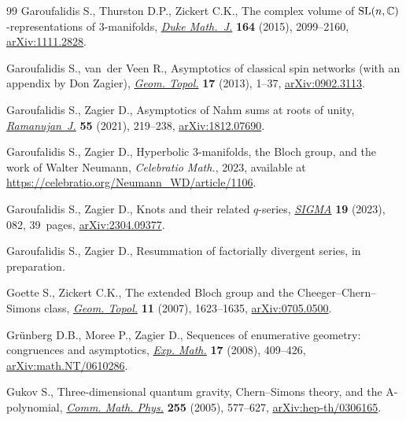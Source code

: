 \documentclass[pdftex]{sigma}
\numberwithin{equation}{section}
\begin{document}
\begin{thebibliography}{99}
Garoufalidis S., Thurston D.P., Zickert C.K., The complex volume of {${\rm
 SL}(n,\mathbb{C})$}-representations of 3-manifolds, \href{https://doi.org/10.1215/00127094-3121185}{\textit{Duke Math.~J.}}
 \textbf{164} (2015), 2099--2160, \href{https://arxiv.org/abs/1111.2828}{arXiv:1111.2828}.

Garoufalidis S., van~der Veen R., Asymptotics of classical spin networks (with
 an appendix by {D}on {Z}agier), \href{https://doi.org/10.2140/gt.2013.17.1}{\textit{Geom. Topol.}} \textbf{17} (2013),
 1--37, \href{https://arxiv.org/abs/0902.3113}{arXiv:0902.3113}.

Garoufalidis S., Zagier D., Asymptotics of {N}ahm sums at roots of unity,
 \href{https://doi.org/10.1007/s11139-020-00266-x}{\textit{Ramanujan~J.}} \textbf{55} (2021), 219--238, \href{https://arxiv.org/abs/1812.07690}{arXiv:1812.07690}.

Garoufalidis S., Zagier D., Hyperbolic 3-manifolds, the {B}loch group, and the
 work of {W}alter {N}eumann, \textit{Celebratio Math.}, 2023, available at
 \url{https://celebratio.org/Neumann_WD/article/1106}.

Garoufalidis S., Zagier D., Knots and their related {$q$}-series,
 \href{https://doi.org/10.3842/SIGMA.2023.082}{\textit{SIGMA}} \textbf{19} (2023), 082, 39~pages, \href{https://arxiv.org/abs/2304.09377}{arXiv:2304.09377}.

Garoufalidis S., Zagier D., Resummation of factorially divergent series, in
 preparation.

Goette S., Zickert C.K., The extended {B}loch group and the
 {C}heeger--{C}hern--{S}imons class, \href{https://doi.org/10.2140/gt.2007.11.1623}{\textit{Geom. Topol.}} \textbf{11} (2007),
 1623--1635, \href{https://arxiv.org/abs/0705.0500}{arXiv:0705.0500}.

Gr\"unberg D.B., Moree P., Zagier D., Sequences of enumerative geometry:
 congruences and asymptotics, \href{https://doi.org/10.1080/10586458.2008.10128870}{\textit{Exp. Math.}} \textbf{17} (2008),
 409--426, \href{https://arxiv.org/abs/math.NT/0610286}{arXiv:math.NT/0610286}.

Gukov S., Three-dimensional quantum gravity, {C}hern--{S}imons theory, and the
 {A}-polynomial, \href{https://doi.org/10.1007/s00220-005-1312-y}{\textit{Comm. Math. Phys.}} \textbf{255} (2005), 577--627,
 \href{https://arxiv.org/abs/hep-th/0306165}{arXiv:hep-th/0306165}.


\end{thebibliography}
\end{document}

